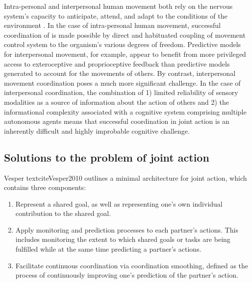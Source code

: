 \begin{CJK}{UTF8}{gbsn}

Intra-personal and interpersonal human movement both rely on the nervous system’s capacity to anticipate, attend, and adapt to the conditions of the environment \citep{Keller2014}.  In the case of intra-personal human movement, successful coordination of is made possible by direct and habituated coupling of movement control system to the organism's various degrees of freedom.  Predictive models for interpersonal movement, for example, appear to benefit from more privileged access to exteroceptive and proprioceptive feedback than predictive models generated to account for the movements of others.  By contrast, interpersonal movement coordination poses a much more significant challenge.  In the case of interpersonal coordination, the combination of 1) limited reliability of sensory modalities as a source of information about the action of others \citep{Wilson2005,Wolpert2003,Frith2007} and 2) the informational complexity associated with a cognitive system comprising multiple autonomous agents \citep{Bernstein1967} means that successful coordination in joint action is an inherently difficult and highly improbable cognitive challenge.


\subsection{Solutions to the problem of joint action\label{sect:solutionsJA}}

Vesper textcite{Vesper2010} outlines a minimal architecture for joint action, which contains three components:

\begin{enumerate}
  \item Represent a shared goal, as well as representing one’s own individual contribution to the shared goal.
  \item Apply monitoring and prediction processes to each partner’s actions. This includes monitoring the extent to which shared goals or tasks are being fulfilled while at the same time predicting a partner’s actions.
  \item Facilitate continuous coordination via coordination smoothing, defined as the process of continuously improving one’s prediction of the partner’s action.
\end{enumerate}


\end{CJK}
